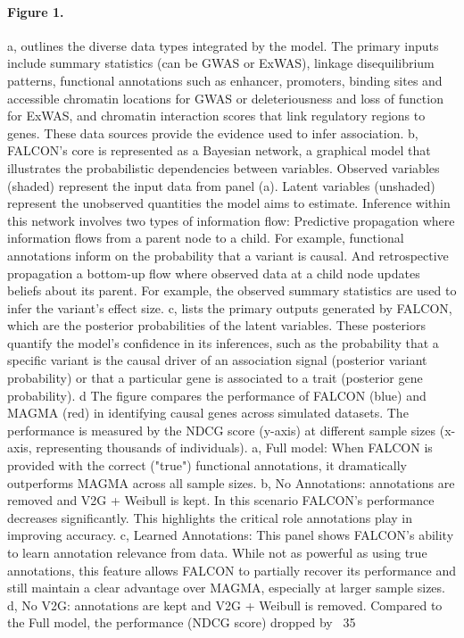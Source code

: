\paragraph{Figure 1.}
a, outlines the diverse data types integrated by the model. The primary inputs include summary statistics (can be GWAS or ExWAS), linkage disequilibrium patterns, functional annotations such as enhancer, promoters, binding sites and accessible chromatin locations for GWAS or deleteriousness and loss of function for ExWAS, and chromatin interaction scores that link regulatory regions to genes. These data sources provide the evidence used to infer association. b, FALCON's core is represented as a Bayesian network, a graphical model that illustrates the probabilistic dependencies between variables. Observed variables (shaded) represent the input data from panel (a). Latent variables (unshaded) represent the unobserved quantities the model aims to estimate. Inference within this network involves two types of information flow: Predictive propagation where information flows from a parent node to a child. For example, functional annotations inform on the probability that a variant is causal. And retrospective propagation a bottom-up flow where observed data at a child node updates beliefs about its parent. For example, the observed summary statistics are used to infer the variant's effect size. c, lists the primary outputs generated by FALCON, which are the posterior probabilities of the latent variables. These posteriors quantify the model's confidence in its inferences, such as the probability that a specific variant is the causal driver of an association signal (posterior variant probability) or that a particular gene is associated to a trait (posterior gene probability). d The figure compares the performance of FALCON (blue) and MAGMA (red) in identifying causal genes across simulated datasets. The performance is measured by the NDCG score (y-axis) at different sample sizes (x-axis, representing thousands of individuals). a, Full model: When FALCON is provided with the correct ("true") functional annotations, it dramatically outperforms MAGMA across all sample sizes. b, No Annotations: annotations are removed and V2G + Weibull is kept. In this scenario FALCON's performance decreases significantly. This highlights the critical role annotations play in improving accuracy. c, Learned Annotations: This panel shows FALCON's ability to learn annotation relevance from data. While not as powerful as using true annotations, this feature allows FALCON to partially recover its performance and still maintain a clear advantage over MAGMA, especially at larger sample sizes. d, No V2G: annotations are kept and V2G + Weibull is removed. Compared to the Full model, the performance (NDCG score) dropped by ~35%